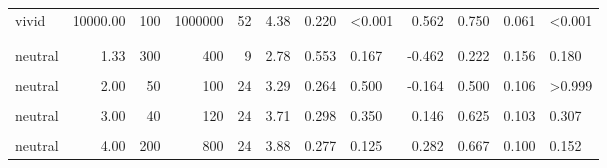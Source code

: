 \documentclass[
]{article}
\begin{document}
\begin{longtable}[t]{lrrrrrrlrrrl}
\hspace{1em}vivid & 10000.00 & 100 & 1000000 & 52 & 4.38 & 0.220 & <0.001 & 0.562 & 0.750 & 0.061 & <0.001\\
\addlinespace[0.3em]
\multicolumn{12}{l}{\textbf{Exp. 5 (filtered)}}\\
\hspace{1em}\cellcolor{gray!10}{neutral} & \cellcolor{gray!10}{1.33} & \cellcolor{gray!10}{30} & \cellcolor{gray!10}{40} & \cellcolor{gray!10}{24} & \cellcolor{gray!10}{2.96} & \cellcolor{gray!10}{0.310} & \cellcolor{gray!10}{0.123} & \cellcolor{gray!10}{-0.364} & \cellcolor{gray!10}{0.417} & \cellcolor{gray!10}{0.105} & \cellcolor{gray!10}{0.541}\\
\hspace{1em}neutral & 1.33 & 300 & 400 & 9 & 2.78 & 0.553 & 0.167 & -0.462 & 0.222 & 0.156 & 0.180\\
\hspace{1em}\cellcolor{gray!10}{neutral} & \cellcolor{gray!10}{2.00} & \cellcolor{gray!10}{20} & \cellcolor{gray!10}{40} & \cellcolor{gray!10}{9} & \cellcolor{gray!10}{3.33} & \cellcolor{gray!10}{0.612} & \cellcolor{gray!10}{0.674} & \cellcolor{gray!10}{-0.096} & \cellcolor{gray!10}{0.333} & \cellcolor{gray!10}{0.177} & \cellcolor{gray!10}{0.508}\\
\hspace{1em}neutral & 2.00 & 50 & 100 & 24 & 3.29 & 0.264 & 0.500 & -0.164 & 0.500 & 0.106 & >0.999\\
\hspace{1em}\cellcolor{gray!10}{neutral} & \cellcolor{gray!10}{3.00} & \cellcolor{gray!10}{10} & \cellcolor{gray!10}{30} & \cellcolor{gray!10}{9} & \cellcolor{gray!10}{3.22} & \cellcolor{gray!10}{0.295} & \cellcolor{gray!10}{0.454} & \cellcolor{gray!10}{-0.333} & \cellcolor{gray!10}{0.444} & \cellcolor{gray!10}{0.186} & \cellcolor{gray!10}{>0.999}\\
\hspace{1em}neutral & 3.00 & 40 & 120 & 24 & 3.71 & 0.298 & 0.350 & 0.146 & 0.625 & 0.103 & 0.307\\
\hspace{1em}\cellcolor{gray!10}{neutral} & \cellcolor{gray!10}{4.00} & \cellcolor{gray!10}{20} & \cellcolor{gray!10}{80} & \cellcolor{gray!10}{9} & \cellcolor{gray!10}{3.78} & \cellcolor{gray!10}{0.524} & \cellcolor{gray!10}{0.587} & \cellcolor{gray!10}{0.188} & \cellcolor{gray!10}{0.556} & \cellcolor{gray!10}{0.186} & \cellcolor{gray!10}{>0.999}\\
\hspace{1em}neutral & 4.00 & 200 & 800 & 24 & 3.88 & 0.277 & 0.125 & 0.282 & 0.667 & 0.100 & 0.152\\

\end{longtable}
\end{document}
